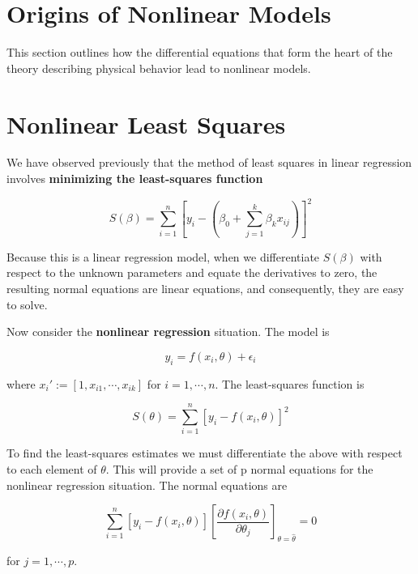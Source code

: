 \documentclass[12pt]{article}
\begin{document}
\section{Origins of Nonlinear Models}

This section outlines how the differential equations that form the heart of the theory describing physical behavior lead to nonlinear models.

\section{Nonlinear Least Squares}

We have observed previously that the method of least squares in linear regression involves \textbf{minimizing the least-squares function}

$$
S(\beta) = \sum_{i=1}^n \left[ y_i - \left( \beta_0 + \sum_{j=1}^k \beta_k x_{ij} \right) \right]^2
$$

Because this is a linear regression model, when we differentiate $S(\beta)$ with respect to the unknown parameters and equate the derivatives to zero, the resulting normal equations are linear equations, and consequently, they are easy to solve.

Now consider the \textbf{nonlinear regression} situation. The model is

$$
y_i = f(x_i, \theta) + \epsilon_i
$$

where $x_i' := [1, x_{i1}, \cdots, x_{ik}]$ for $i = 1, \cdots, n$. The least-squares function is 

$$
S(\theta) = \sum_{i=1}^n \left[ y_i - f(x_i, \theta) \right]^2
$$

To find the least-squares estimates we must differentiate the above with respect to each element of $\theta$. This will provide a set of p normal equations for the nonlinear regression situation. The normal equations are

$$
\sum_{i=1}^n [y_i - f(x_i, \theta)] \left[  \frac{\partial f(x_i, \theta) }{\partial \theta_j } \right]_{\theta = \hat{\theta}} = 0
$$

for $j = 1, \cdots, p$. 
\end{document}
